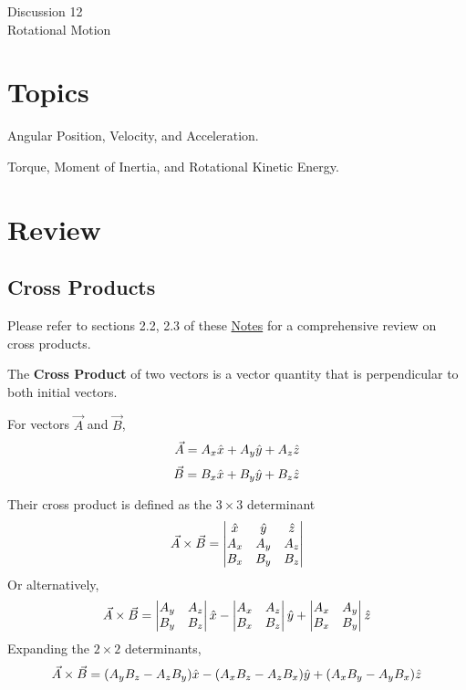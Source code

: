 \documentclass[11pt]{article}
\theoremstyle{gangnamstyle}{\newtheorem{definition}{Definition}[]}
\theoremstyle{gangnamstyle}{\newtheorem{example}{Example}[]}
\theoremstyle{gangnamstyle}{\newtheorem{problem}{Problem}[]}
\begin{document}
\normalfont
\pagestyle{pages}


\begin{center}
\vspace{3in}
{\Large Discussion 12 } \\ [0.05in]
Rotational Motion \\ [-0.5in]
\end{center}

\section*{Topics}
Angular Position, Velocity, and Acceleration. 

Torque, Moment of Inertia, and Rotational Kinetic Energy. 

\section{Review}

\subsection{Cross Products}

Please refer to sections 2.2, 2.3 of these \href{https://bcourses.berkeley.edu/courses/1535243/files/folder/Section/103/Notes?preview=89181658}{Notes} for a comprehensive review on cross products. 

The \textbf{Cross Product} of two vectors is a vector quantity that is perpendicular to both initial vectors. 

For vectors $\Vec{A}$ and $\Vec{B}$, 
\[ \Vec{A} = A_x\Hat{x} + A_y\Hat{y} + A_z\Hat{z} \]
\[ \Vec{B} = B_x\Hat{x} + B_y\Hat{y} + B_z\Hat{z} \]

Their cross product is defined as the $3 \times 3$ determinant
\[ \Vec{A} \times \Vec{B} = 
\begin{vmatrix}
\Hat{x} & \Hat{y} & \Hat{z} \\
A_x & A_y & A_z \\
B_x & B_y & B_z
\end{vmatrix} \]
Or alternatively, 
\[ \Vec{A} \times \Vec{B} = 
\begin{vmatrix}
A_y & A_z \\
B_y & B_z
\end{vmatrix} \Hat{x}
- 
\begin{vmatrix}
A_x & A_z \\
B_x & B_z
\end{vmatrix} \Hat{y}
+ 
\begin{vmatrix}
A_x & A_y \\
B_x & B_y
\end{vmatrix} \Hat{z} \]
Expanding the $2 \times 2$ determinants, 
\[ \Vec{A} \times \Vec{B} = (A_yB_z - A_zB_y) \Hat{x} - (A_xB_z - A_zB_x) \Hat{y} + (A_xB_y - A_yB_x) \Hat{z} \]
\end{document}
